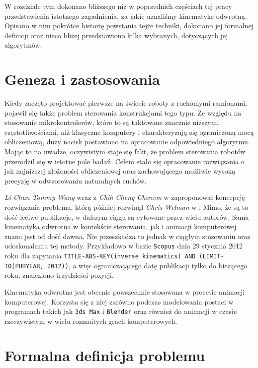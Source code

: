 \documentclass[11pt]{mwrep}
\begin{document}
W rozdziale tym dokonano bliższego niż w poprzednich częściach tej pracy przedstawienia istotnego zagadnienia, za jakie uznaliśmy kinematykę odwrotną. Opisano w nim pokrótce historię powstania tejże techniki, dokonano jej formalnej definicji oraz nieco bliżej przedstawiono kilka wybranych, dotyczących jej algorytmów.

  \section{Geneza i zastosowania}

  Kiedy zaczęto projektować pierwsze na świecie roboty z ruchomymi ramionami, pojawił się także problem sterowania konstrukcjami tego typu. Ze względu na stosowanie mikrokontrolerów, które to są taktowane znacznie niższymi częstotliwościami, niż klasyczne komputery i charakteryzują się ograniczoną mocą obliczeniową, duży nacisk postawiono na opracowanie odpowiedniego algorytmu. Mając to na uwadze, oczywistym staje się fakt, że problem sterowania robotów przerodził się w istotne pole badań. Celem stało się opracowanie rozwiązania o jak najniższej złożoności obliczeniowej oraz zachowującego możliwie wysoką precyzję w odwzorowaniu naturalnych ruchów.

  \textit{Li-Chun Tommy Wang} wraz z \textit{Chih Cheng Chenem} w \cite{ikrobot} zaproponował koncepcję rozwiązania problemu, którą później rozwinął \textit{Chris Welman} w \cite{welman}. Mimo, że są to dość leciwe publikacje, w dalszym ciągu są cytowane przez wielu autorów. Sama kinematyka odwrotna w kontekście sterowania, jak i animacji komputerowej znana jest od dość dawna. Nie przeszkadza to jednak w ciągłym stosowaniu oraz udoskonalaniu tej metody. Przykładowo w bazie \texttt{Scopus} dnia 29 stycznia 2012 roku dla zapytania \verb|TITLE-ABS-KEY(inverse kinematics) AND (LIMIT-TO(PUBYEAR, 2012))|, a więc ograniczającego datę publikacji tylko do bieżącego roku, znaleziono trzydzieści pozycji.

  Kinematyka odwrotna jest obecnie powszechnie stosowana w procesie animacji komputerowej. Korzysta się z niej zarówno podczas modelowania postaci w programach takich jak \texttt{3ds Max} i \texttt{Blender} oraz również do animacji w czasie rzeczywistym w wielu rozmaitych grach komputerowych.
  
\section{Formalna definicja problemu}
\end{document}
